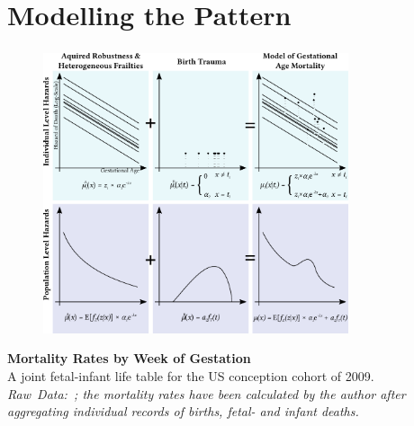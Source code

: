 \documentclass{beamer}
\begin{document}
\section{Modelling the Pattern} %

\begin{frame}
\frametitle{\insertsection}

\begin{figure}[htb!]
\includegraphics[width = 0.8\textwidth]{./fig/the_model.pdf}\\
\end{figure}

\footnotesize\textbf{Mortality Rates by Week of Gestation}\\
A joint fetal-infant life table for the US conception cohort of 2009.\\
\scriptsize\emph{Raw~Data:~\textcite{DVS2015}; the mortality rates have been calculated by the author after aggregating individual records of births, fetal- and infant deaths.}

\end{frame}

\end{document}
